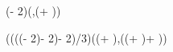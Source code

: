 \documentclass[dark]{cgem-poster}
\begin{document}

\newlength{\PosterOuterMarginSize}
\setlength{\PosterOuterMarginSize}{7.5mm}

\newcommand{\PosterBackgroundLeft}{\PosterOuterMarginSize}
\newcommand{\PosterBackgroundWidth}{\dimexpr (\pagewidth - 2\PosterOuterMarginSize)\relax}
\newcommand{\PosterBackgroundTop}{\dimexpr (\titleheight + \PosterOuterMarginSize)\relax}
\newcommand{\PosterBackgroundHeight}{\dimexpr (\pageheight - \PosterBackgroundTop - \PosterOuterMarginSize)\relax}

\begin{textblock*}{\PosterBackgroundWidth{}}(\PosterBackgroundLeft{},\PosterBackgroundTop{})
  \begin{minipage}[t][\PosterBackgroundHeight{}][t]{\PosterBackgroundWidth{}}
  \end{minipage}
\end{textblock*}

\newlength{\PosterInnerMarginSize}
\setlength{\PosterInnerMarginSize}{1cm}

\newcommand{\PosterInnerLeft}{\dimexpr (\PosterOuterMarginSize + \PosterInnerMarginSize)\relax}
\newcommand{\PosterInnerWidth}{\dimexpr (\PosterBackgroundWidth - 2\PosterInnerMarginSize)\relax}
\newcommand{\PosterInnerTop}{\dimexpr (\PosterBackgroundTop + \PosterInnerMarginSize)\relax}
\newcommand{\PosterInnerHeight}{\dimexpr (\PosterBackgroundHeight - 2\PosterInnerMarginSize)\relax}

\newcommand{\PosterColumnWidth}{\dimexpr ((\PosterInnerWidth - 2\PosterInnerMarginSize)/3)\relax}

\newcommand{\PosterColumnOneLeft}{\PosterInnerLeft}
\newcommand{\PosterColumnOneWidth}{\PosterColumnWidth}
\newcommand{\PosterColumnOneTop}{\PosterInnerTop}
\newcommand{\PosterColumnOneHeight}{\PosterInnerHeight}

\begin{textblock*}{\PosterColumnOneWidth{}}(\PosterColumnOneLeft{},\PosterColumnOneTop{})
  \begin{minipage}[t][\PosterColumnOneHeight{}][t]{\PosterColumnOneWidth{}}
  \end{minipage}
\end{textblock*}
\end{document}
